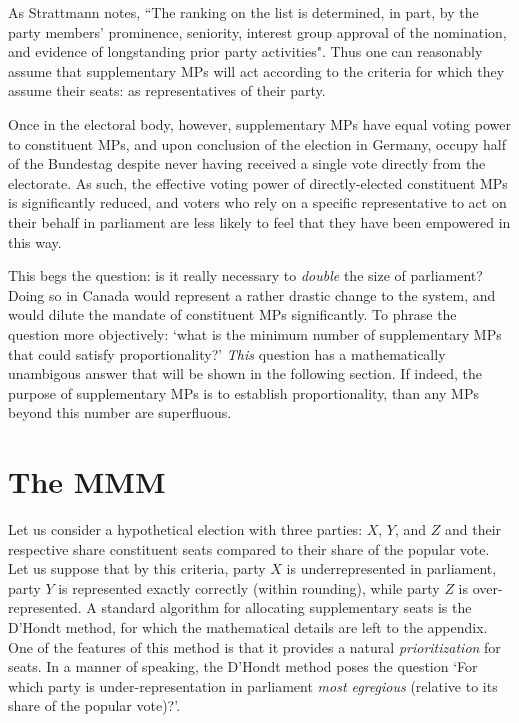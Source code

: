 \documentclass[DIV=calc, paper=a4, fontsize=11pt, twocolumn]{scrartcl}	 %
\begin{document}
As Strattmann notes\cite{Stratmann}, ``The ranking on the list is determined, in part, by the party members' prominence, seniority, interest group approval of the nomination, and evidence of longstanding prior party activities". 
Thus one can reasonably assume that supplementary MPs will act according to the criteria for which they assume their seats: as representatives of their party.

Once in the electoral body, however, supplementary MPs have equal voting power to constituent MPs, and upon conclusion of the election in Germany, occupy half of the Bundestag despite never having received a single vote directly from the electorate. As such, the effective voting power of directly-elected constituent MPs is significantly reduced, and voters who rely on a specific representative to act on their behalf in parliament are less likely to feel that they have been empowered in this way. 

This begs the question: is it really necessary to \emph{double} the size of parliament? Doing so in Canada would represent a rather drastic change to the system, and would dilute the mandate of constituent MPs significantly. To phrase the question more objectively: `what is the minimum number of supplementary MPs that could satisfy proportionality?' 
\emph{This} question has a mathematically unambigous answer that will be shown in the following section. If indeed, the purpose of supplementary MPs is to establish proportionality, than any MPs beyond this number are superfluous.

\section{The MMM}
\label{sec:model_proposal}

Let us consider a hypothetical election with three parties: $X$, $Y$, and $Z$ and their respective share constituent seats compared to their share of the popular vote. Let us suppose that by this criteria, party $X$ is underrepresented in parliament, party $Y$ is represented exactly correctly (within rounding), while party $Z$ is over-represented. 
A standard algorithm for allocating supplementary seats is the D'Hondt method, for which the mathematical details are left to the appendix. One of the features of this method is that it provides a natural \emph{prioritization} for seats. In a manner of speaking, the D'Hondt method poses the question `For which party is under-representation in parliament \emph{most egregious} (relative to its share of the popular vote)?'. 
\end{document}
